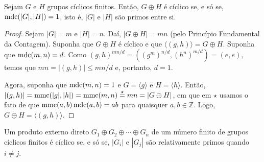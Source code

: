 	\begin{theorem}
	\label{crit}
		Sejam $G$ e $H$ grupos cíclicos finitos. Então, $G\oplus H$ é 
		cíclico se, e só se, $\operatorname{mdc}(|G|, |H|) = 1$, isto é, $|G|$ e $|H|$ 
		são primos entre si.
	\end{theorem}
	\begin{proof}
		Sejam $|G| = m$ e $|H| = n$. Daí, $|G\oplus H| = mn$ 
		(pelo Princípio Fundamental da Contagem). Suponha que $G\oplus H$ 
		é cíclico e que $\langle (g, h) \rangle = G\oplus H$. Suponha que
		$\operatorname{mdc}(m,n) = d$. Como 
		$(g, h)^{mn/d} = ((g^m)^{n/d} , (h^n)^{m/d}) = (e,e)$, 
		temos que $mn = |(g, h)| \leq mn/d$ e, portanto, $d = 1$.
		\par\vspace{0.3cm} Agora, suponha que $\operatorname{mdc}(m, n) = 1$ e 
		$G = \langle g  \rangle $ e $H = \langle h \rangle$. Então, 
		$|(g,h)|=\operatorname{mmc}(|g|,|h|)=\operatorname{mmc}(m,n)\overset{\star}{=}mn=|G\oplus H|$, 
		em que em $\star$ usamos o fato de que $\operatorname{mmc}(a,b)\operatorname{mdc}(a,b) = ab$ 
		para quaisquer $a,b\in\mathbb{Z}$.
		Logo, $G\oplus H = \langle (g, h) \rangle$. 
	\end{proof}
	\begin{corollary}
	\label{C1}
		Um produto externo direto $G_1\oplus G_2\oplus\cdots\oplus G_n$ 
		de um número finito de grupos cíclicos finitos é cíclico 
		se, e só se, $|G_i|$ e $|G_j|$ são relativamente primos quando 
		$i\neq j$.
	\end{corollary}
